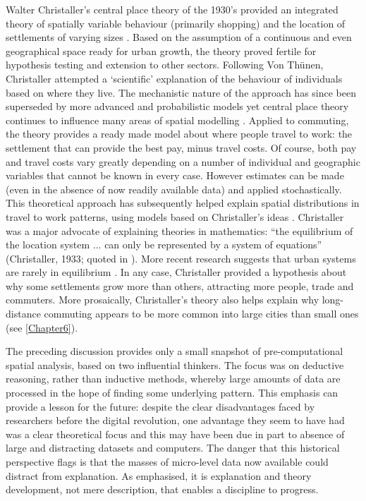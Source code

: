 Walter Christaller's central place theory of the 1930's provided an integrated
theory of spatially variable behaviour (primarily shopping) and the location of
settlements of varying sizes \citep{matthews2008geography}. Based on the
assumption of a continuous and even geographical space ready for urban growth,
the theory proved fertile for hypothesis testing and extension to other sectors.
Following Von Th\"{u}nen, Christaller
attempted a `scientific' explanation of the behaviour of individuals based on
where they live. The mechanistic nature of the approach has since been
superseded by more advanced and probabilistic models
yet central place theory continues to influence
many areas of spatial modelling \citep{Wilson1972-theoretical, Sonis2005,
Farooq2012-integreted}. Applied to commuting, the theory provides a ready made
model about where people travel to work: the settlement that can provide the
best pay, minus travel costs. Of course, both pay and travel costs vary greatly
depending on a number of individual and geographic variables that cannot be known
in every case. However estimates can be made (even in the absence of now
readily available data) and applied stochastically. 
This theoretical approach has subsequently helped
explain spatial distributions in travel to work patterns, using models based on
Christaller's ideas \citep{Tabuchi2006-commuting-costs}. Christaller was
a major advocate of explaining theories in
mathematics: ``the equilibrium of the location system ... can only be
represented by a system of equations'' (Christaller, 1933; quoted in
\citealp[p.~35]{Wilson1972-theoretical}).
More recent research suggests that urban systems are rarely in equilibrium
\citep{batty2007cities}. In any case, Christaller provided a hypothesis about
why some settlements grow more than others, attracting more people, trade and
commuters.
More prosaically, Christaller's theory also helps explain why
long-distance commuting appears to be more common into large cities than small ones
(see \cref{Chapter6}).

The preceding discussion provides only a small snapshot of pre-computational
spatial analysis, based on two influential thinkers. The
focus was on deductive reasoning, rather than inductive methods, whereby large
amounts of data are processed in the hope of finding some underlying pattern.
This emphasis can provide a lesson for the future: despite the clear
disadvantages faced by researchers before the digital revolution, one
advantage they seem to have had was a clear theoretical focus and this may
have been due in part to absence of large and distracting datasets and
computers.
The danger that this historical perspective flags is that the masses of
micro-level data now available could distract from explanation. As
\citet{Wilson1972-theoretical} emphasised, it is explanation and theory
development, not mere description, that enables a discipline to progress. 


